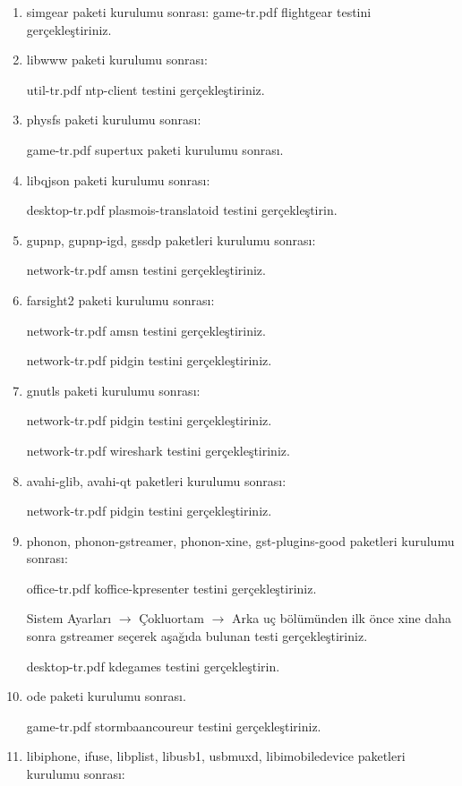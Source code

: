 \documentclass[a4paper,10pt]{article}
\begin{document}
\begin{enumerate}
\item simgear paketi kurulumu sonrası:
game-tr.pdf flightgear testini gerçekleştiriniz.

\item libwww paketi kurulumu sonrası:

util-tr.pdf ntp-client testini gerçekleştiriniz.

\item physfs paketi kurulumu sonrası:

game-tr.pdf supertux paketi kurulumu sonrası.

\item libqjson paketi kurulumu sonrası:

desktop-tr.pdf plasmois-translatoid testini gerçekleştirin.

\item gupnp, gupnp-igd, gssdp paketleri kurulumu sonrası:

network-tr.pdf amsn testini gerçekleştiriniz.

\item farsight2 paketi kurulumu sonrası:

network-tr.pdf amsn testini gerçekleştiriniz.

network-tr.pdf pidgin testini gerçekleştiriniz.

\item gnutls paketi kurulumu sonrası:

network-tr.pdf pidgin testini gerçekleştiriniz.

network-tr.pdf wireshark testini gerçekleştiriniz.

\item avahi-glib, avahi-qt paketleri kurulumu sonrası:

network-tr.pdf pidgin testini gerçekleştiriniz.

\item phonon, phonon-gstreamer, phonon-xine, gst-plugins-good paketleri kurulumu sonrası:

office-tr.pdf koffice-kpresenter testini gerçekleştiriniz.

Sistem Ayarları $\rightarrow$ Çokluortam $\rightarrow$ Arka uç bölümünden ilk önce xine daha sonra gstreamer seçerek aşağıda bulunan testi gerçekleştiriniz.

desktop-tr.pdf kdegames testini gerçekleştirin.
\item ode paketi kurulumu sonrası.

game-tr.pdf stormbaancoureur testini gerçekleştiriniz.

\item libiphone, ifuse, libplist, libusb1, usbmuxd, libimobiledevice paketleri kurulumu sonrası:


\end{enumerate}
\end{document}
